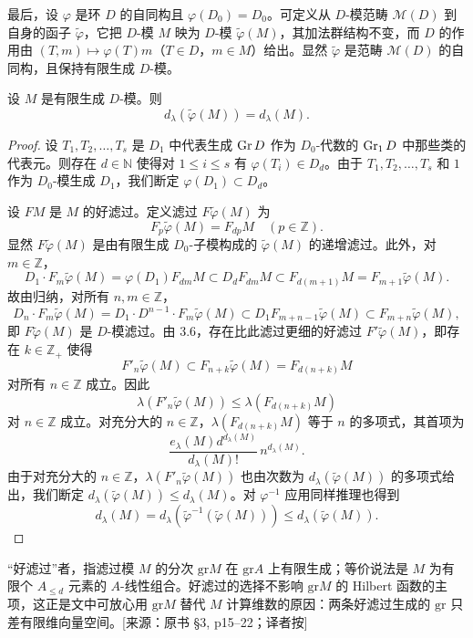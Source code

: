最后，设 $\varphi$ 是环 $D$ 的自同构且 $\varphi(D_0)=D_0$。可定义从 $D$-模范畴 $\mathcal{M}(D)$ 到自身的函子 $\tilde\varphi$，它把 $D$-模 $M$ 映为 $D$-模 $\tilde\varphi(M)$，其加法群结构不变，而 $D$ 的作用由 $(T,m)\longmapsto\varphi(T)m$（$T\in D$，$m\in M$）给出。显然 $\tilde\varphi$ 是范畴 $\mathcal{M}(D)$ 的自同构，且保持有限生成 $D$-模。

\begin{proposition}
设 $M$ 是有限生成 $D$-模。则
$$d_\lambda(\tilde\varphi(M))=d_\lambda(M).$$
\end{proposition}

\begin{proof}
设 $T_1,T_2,\dots,T_s$ 是 $D_1$ 中代表生成 $\operatorname{Gr} D$ 作为 $D_0$-代数的 $\operatorname{Gr}_1 D$ 中那些类的代表元。则存在 $d\in\mathbb{N}$ 使得对 $1\le i\le s$ 有 $\varphi(T_i)\in D_d$。由于 $T_1,T_2,\dots,T_s$ 和 $1$ 作为 $D_0$-模生成 $D_1$，我们断定 $\varphi(D_1)\subset D_d$。

设 $F M$ 是 $M$ 的好滤过。定义滤过 $F\tilde\varphi(M)$ 为
$$F_p\tilde\varphi(M)=F_{dp}M\quad (p\in\mathbb{Z}).$$
显然 $F\tilde\varphi(M)$ 是由有限生成 $D_0$-子模构成的 $\tilde\varphi(M)$ 的递增滤过。此外，对 $m\in\mathbb{Z}$，
$$D_1\cdot F_m\tilde\varphi(M)=\varphi(D_1)F_{dm}M\subset D_dF_{dm}M\subset F_{d(m+1)}M=F_{m+1}\tilde\varphi(M).$$
故由归纳，对所有 $n,m\in\mathbb{Z}$，
$$D_n\cdot F_m\tilde\varphi(M)=D_1\cdot D^{n-1}\cdot F_m\tilde\varphi(M)\subset D_1F_{m+n-1}\tilde\varphi(M)\subset F_{m+n}\tilde\varphi(M),$$
即 $F\tilde\varphi(M)$ 是 $D$-模滤过。由 3.6，存在比此滤过更细的好滤过 $F'\tilde\varphi(M)$，即存在 $k\in\mathbb{Z}_+$ 使得
$$F'_n\tilde\varphi(M)\subset F_{n+k}\tilde\varphi(M)=F_{d(n+k)}M$$
对所有 $n\in\mathbb{Z}$ 成立。因此
$$\lambda(F'_n\tilde\varphi(M))\le\lambda(F_{d(n+k)}M)$$
对 $n\in\mathbb{Z}$ 成立。对充分大的 $n\in\mathbb{Z}$，$\lambda(F_{d(n+k)}M)$ 等于 $n$ 的多项式，其首项为
$$\frac{e_\lambda(M)d^{d_\lambda(M)}}{d_\lambda(M)!}\,n^{d_\lambda(M)}.$$
由于对充分大的 $n\in\mathbb{Z}$，$\lambda(F'_n\tilde\varphi(M))$ 也由次数为 $d_\lambda(\tilde\varphi(M))$ 的多项式给出，我们断定 $d_\lambda(\tilde\varphi(M))\le d_\lambda(M)$。对 $\varphi^{-1}$ 应用同样推理也得到
$$d_\lambda(M)=d_\lambda(\tilde\varphi^{-1}(\tilde\varphi(M)))\le d_\lambda(\tilde\varphi(M)).$$
\end{proof}
\begin{annote}
“好滤过”者，指滤过模 $M$ 的分次 $\mathrm{gr}M$ 在 $\mathrm{gr}A$ 上有限生成；等价说法是 $M$ 为有限个 $A_{\le d}$ 元素的 $A$-线性组合。好滤过的选择不影响 $\mathrm{gr}M$ 的 Hilbert 函数的主项，这正是文中可放心用 $\mathrm{gr}M$ 替代 $M$ 计算维数的原因：两条好滤过生成的 $\mathrm{gr}$ 只差有限维向量空间。[来源：原书 §3, p15–22；译者按]
\end{annote}



